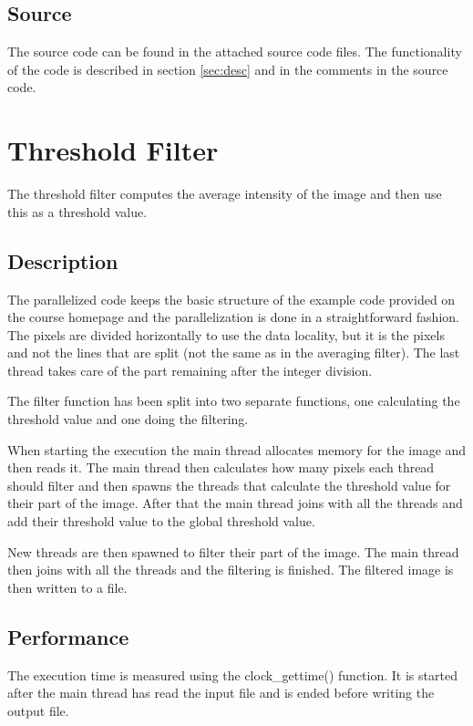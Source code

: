 \documentclass[a4paper, 12pt]{article}
\begin{document}
\subsection{Source}

The source code can be found in the attached source code files.
The functionality of the code is described in section \ref{sec:desc} and in the
comments in the source code.


\section{Threshold Filter}
The threshold filter computes the average intensity of the image and then use
this as a threshold value.


\subsection{Description}
\label{sec:desc2}
The parallelized code keeps the basic structure of the example code provided on
the course homepage and the parallelization is done in a straightforward
fashion. The pixels are divided horizontally to use the data locality, but it is
the pixels and not the lines that are split (not the same as in the averaging
filter). The last thread takes care of the part remaining after the integer
division.

The filter function has been split into two separate functions, one calculating
the threshold value and one doing the filtering.

When starting the execution the main thread allocates memory for the image and
then reads it. The main thread then calculates how many pixels each thread
should filter and then spawns the threads that calculate the threshold value for
their part of the image. After that the main thread joins with all the threads
and add their threshold value to the global threshold value.

New threads are then spawned to filter their part of the image. The main thread
then joins with all the threads and the filtering is finished. The filtered
image is then written to a file.

\subsection{Performance}

The execution time is measured using the clock\_gettime() function. It is
started after the main thread has read the input file and is ended before
writing the output file.
\end{document}
